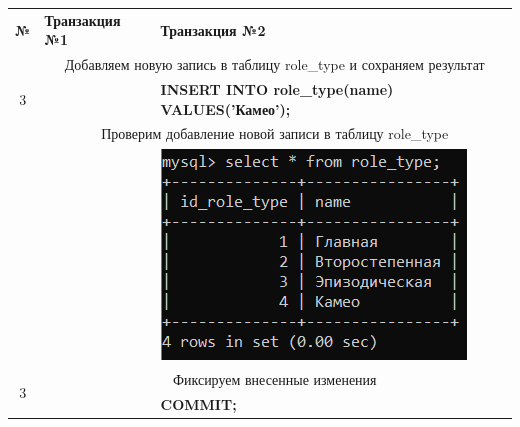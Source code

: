 \documentclass[11pt,a4paper,final]{article} %
\begin{document}
\newpage
\begin{table}[H]
	\label{tab:tb2}
	
	\begin{tabularx}{\textwidth}{|c|X|X|}
		\cline{1-3}
		\textbf{№} & \textbf{Транзакция №1} & \textbf{Транзакция №2} \\
		\cline{1-3}
		
		\multirow{3}{*}{3} & \multicolumn{2}{c|}{Добавляем новую запись в таблицу role\_type и сохраняем результат}\\
		\cline{2-3}
		& 
		\vspace{-6pt}
		\hspace{-5pt}
		& 
		\vspace{-6pt}
		\hspace{-5pt}
		\textbf{INSERT INTO role\_type(name) VALUES('Камео');}
		\\
		\cline{1-3}
		
		\multirow{3}{*}{3} & \multicolumn{2}{c|}{Проверим добавление новой записи в таблицу role\_type}\\
		\cline{2-3}
		& 
		\vspace{-6pt}
		\hspace{-5pt}
		& 
		\vspace{-6pt}
		\hspace{-5pt}
		\includegraphics[width=1\linewidth]{pic24.png}
		\\
		\cline{1-3}
		
		\multirow{3}{*}{3} & \multicolumn{2}{c|}{Фиксируем внесенные изменения}\\
		\cline{2-3}
		& 
		\vspace{-6pt}
		\hspace{-5pt}
		& 
		\vspace{-6pt}
		\hspace{-5pt}
		\textbf{COMMIT;}
		\\
		\cline{1-3}
		

\end{tabularx}
\end{table}
\end{document}

